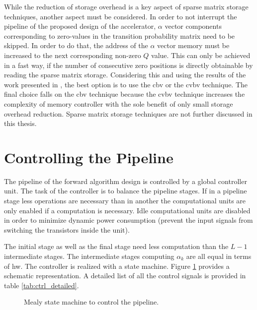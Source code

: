 \documentclass[mscthesis]{usiinfthesis}
\begin{document}
While the reduction of storage overhead is a key aspect of sparse matrix
storage techniques, another aspect must be considered. In order to not
interrupt the pipeline of the proposed design of the accelerator, $\alpha$
vector components corresponding to zero-values in the transition probability
matrix need to be skipped. In order to do that, the address of the $\alpha$
vector memory must be increased to the next corresponding non-zero $Q$ value.
This can only be achieved in a fast way, if the number of consecutive zero
positions is directly obtainable by reading the sparse matrix storage.
Considering this and using the results of the work presented in
\cite{FCCM12_Kestur}, the best option is to use the \gls{cbv} or the \gls{cvbv}
technique. The final choice falls on the \gls{cbv} technique because the
\gls{cvbv} technique increases the complexity of memory controller with the
sole benefit of only small storage overhead reduction. Sparse matrix storage
techniques are not further discussed in this thesis.

\section{Controlling the Pipeline}
\label{ch:design_ctrl}

The pipeline of the forward algorithm design is controlled by a global controller
unit. The task of the controller is to balance the pipeline stages. If in a
pipeline stage less operations are necessary than in another the computational
units are only enabled if a computation is necessary. Idle computational units
are disabled in order to minimize dynamic power consumption (prevent the input
signals from switching the transistors inside the unit).

The initial stage as well as the final stage need less computation than the
$L-1$ intermediate stages. The intermediate stages computing $\alpha_k$ are all
equal in terms of \gls{hw}. The controller is realized with a state machine.
Figure \ref{fig:arch_sm} provides a schematic representation. A detailed list
of all the control signals is provided in table \ref{tab:ctrl_detailed}.

\begin{figure}
    \centering
    
    \caption{Mealy state machine to control the pipeline.}
    \label{fig:arch_sm}
\end{figure}
\end{document}

